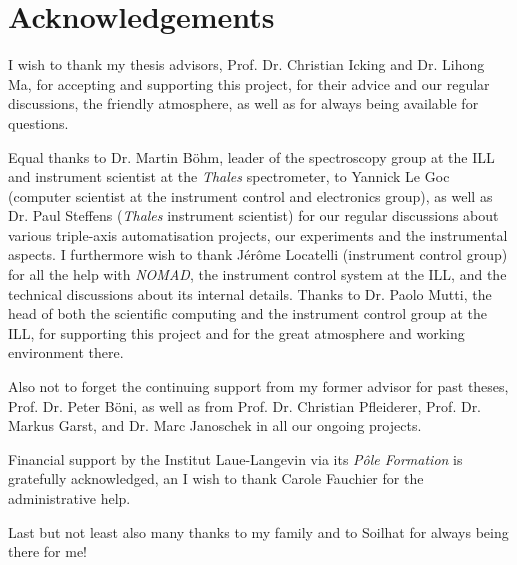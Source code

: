 %
%

\chapter*{Acknowledgements}

I wish to thank my thesis advisors, Prof. Dr. Christian Icking and Dr. Lihong Ma, for accepting 
and supporting this project, for their advice and our regular discussions, the friendly atmosphere, 
as well as for always being available for questions.

Equal thanks to Dr. Martin B\"ohm, leader of the spectroscopy group at the ILL and instrument 
scientist at the \textit{Thales} spectrometer, to Yannick Le Goc (computer scientist at the instrument 
control and electronics group), as well as Dr. Paul Steffens (\textit{Thales} instrument scientist) for our 
regular discussions about various triple-axis automatisation projects, our experiments and the
instrumental aspects. I furthermore wish to thank Jérôme Locatelli (instrument control group) for
all the help with \textit{NOMAD}, the instrument control system at the ILL, and the technical discussions
about its internal details. 
Thanks to Dr. Paolo Mutti, the head of both the scientific computing and the instrument control group 
at the ILL, for supporting this project and for the great atmosphere and working environment there.

Also not to forget the continuing support from my former advisor for past theses, Prof. Dr. Peter B\"oni,
as well as from Prof. Dr. Christian Pfleiderer, Prof. Dr. Markus Garst, and Dr. Marc Janoschek in all our ongoing projects.

Financial support by the Institut Laue-Langevin via its \textit{P\^ole Formation} is gratefully acknowledged,
an I wish to thank Carole Fauchier for the administrative help.

Last but not least also many thanks to my family and to Soilhat for always being there for me!
